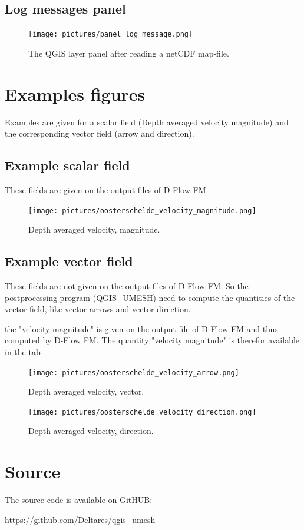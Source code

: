 \documentclass{deltares_memo}
\newcommand{\dflowfm}{D-Flow FM\xspace}
\newcommand{\qumesh}{QGIS\_UMESH\xspace}
\newcommand{\qgis}{QGIS\xspace}
\newcommand{\netcdf}{netCDF\xspace}
\begin{document}
\subsection{Log messages panel}
\begin{figure}[H]
	\centering
	\texttt{[image: pictures/panel\_log\_message.png]}
	\caption{The \qgis layer panel after reading a \netcdf map-file.\label{fig:panel_layer}}
\end{figure}
\section{Examples figures}
Examples are given for a scalar field (Depth averaged velocity magnitude) and the corresponding vector field (arrow and direction).
\subsection{Example scalar field}
These fields are given on the output files of \dflowfm.
\begin{figure}[H]
	\centering
	\texttt{[image: pictures/oosterschelde\_velocity\_magnitude.png]}
	\caption{Depth averaged velocity, magnitude.\label{fig:velocity_magnitude}}
\end{figure}
\subsection{Example vector field}
These fields are not given on the output files of \dflowfm.
So the postprocessing program (\qumesh) need to compute the quantities of the vector field, like vector arrows and vector direction.

\Note the "velocity magnitude" is given on the output file of \dflowfm and thus computed by \dflowfm.
The quantity "velocity magnitude" is therefor available in the tab 
\begin{figure}[H]
	\centering
	\texttt{[image: pictures/oosterschelde\_velocity\_arrow.png]}
	\caption{Depth averaged velocity, vector.\label{fig:velocity_vector}}
\end{figure}

\begin{figure}[H]
	\centering
	\texttt{[image: pictures/oosterschelde\_velocity\_direction.png]}
	\caption{Depth averaged velocity, direction.\label{fig:velocity_vector_direction}}
\end{figure}
\section{Source}
The source code is available on GitHUB:

\url{https://github.com/Deltares/qgis_umesh}
\end{document}
